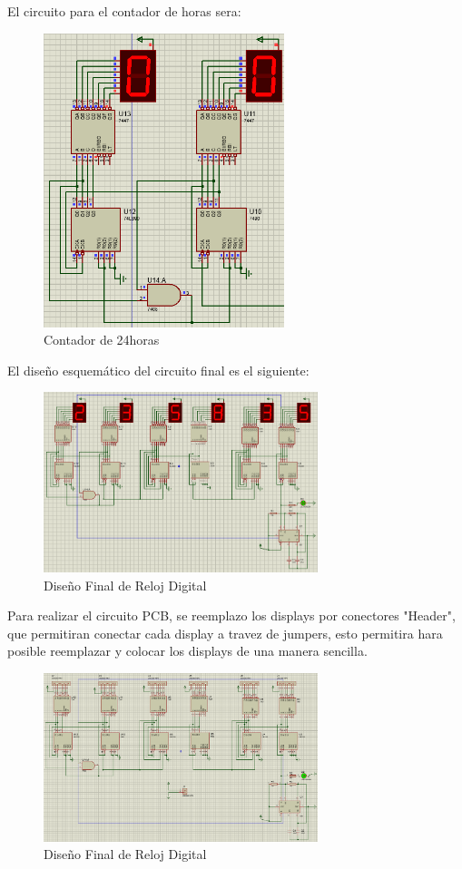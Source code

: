 \documentclass[journal]{IEEEtran}
\begin{document}
El circuito para el contador de horas sera:
\newline
\begin{figure}[htb]
    \centering
    \includegraphics[width=7cm]{images/image8.png}
    \caption{Contador de 24horas}\label{cont_24}
\end{figure}
\newline
El diseño esquemático del circuito final es el siguiente:
\newline
\begin{figure}[htb]
    \centering
    \includegraphics[width=8cm]{images/image11.png}
    \caption{Diseño Final de Reloj Digital}\label{Diseno_final}
\end{figure}
Para realizar el circuito PCB, se reemplazo los displays por conectores "Header", que permitiran conectar cada display  a travez de jumpers, esto permitira hara posible reemplazar y colocar los displays de una manera sencilla.
\begin{figure}[htb]
    \centering
    \includegraphics[width=8cm]{images/image10.png}
    \caption{Diseño Final de Reloj Digital}\label{Diseno_final_toPCB}
\end{figure}
\end{document}

